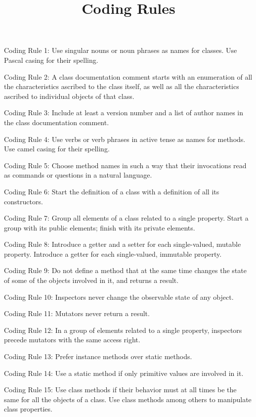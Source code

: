 \documentclass{article}
\title{Coding Rules}
\begin{document}
\maketitle

\par Coding Rule 1: Use singular nouns or noun phrases as names for classes. Use Pascal casing for their spelling.
\par Coding Rule 2: A class documentation comment starts with an enumeration of all the characteristics ascribed to the class itself, as well as all the characteristics ascribed to individual objects of that class.
\par Coding Rule 3: Include at least a version number and a list of author names in the class documentation comment.
\par Coding Rule 4: Use verbs or verb phrases in active tense as names for methods. Use camel casing for their spelling.
\par Coding Rule 5: Choose method names in such a way that their invocations read as commands or questions in a natural language.
\par Coding Rule 6: Start the definition of a class with a definition of all its constructors.
\par Coding Rule 7: Group all elements of a class related to a single property. Start a group with its public elements; finish with its private elements. 
\par Coding Rule 8: Introduce a getter and a setter for each single-valued, mutable property. Introduce a getter for each single-valued, immutable property.
\par Coding Rule 9: Do not define a method that at the same time changes the state of some of the objects involved in it, and returns a result.
\par Coding Rule 10: Inspectors never change the observable state of any object.
\par Coding Rule 11: Mutators never return a result.
\par Coding Rule 12: In a group of elements related to a single property, inspectors precede mutators with the same access right.
\par Coding Rule 13: Prefer instance methods over static methods.
\par Coding Rule 14: Use a static method if only primitive values are involved in it.
\par Coding Rule 15: Use class methods if their behavior must at all times be the same for all the objects of a class. Use class methods among others to manipulate class properties.
\end{document}
